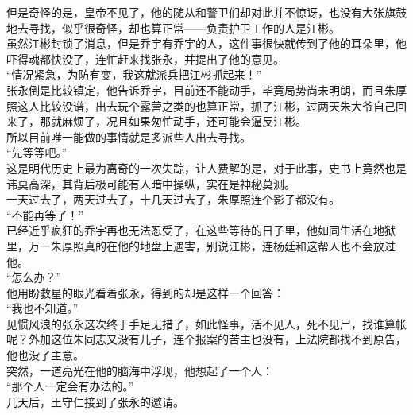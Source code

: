 \begin{multicols}{\theparacolNo}
但是奇怪的是，皇帝不见了，他的随从和警卫们却对此并不惊讶，也没有大张旗鼓地去寻找，似乎很奇怪，却也算正常——负责护卫工作的人是江彬。\\

虽然江彬封锁了消息，但是乔宇有乔宇的人，这件事很快就传到了他的耳朵里，他吓得魂都快没了，连忙赶来找张永，并提出了他的意见。\\

“情况紧急，为防有变，我这就派兵把江彬抓起来！”\\

张永倒是比较镇定，他告诉乔宇，目前还不能动手，毕竟局势尚未明朗，而且朱厚照这人比较没谱，出去玩个露营之类的也算正常，抓了江彬，过两天朱大爷自己回来了，那就麻烦了，况且如果匆忙动手，还可能会逼反江彬。\\

所以目前唯一能做的事情就是多派些人出去寻找。\\

“先等等吧。”\\

这是明代历史上最为离奇的一次失踪，让人费解的是，对于此事，史书上竟然也是讳莫高深，其背后极可能有人暗中操纵，实在是神秘莫测。\\

一天过去了，两天过去了，十几天过去了，朱厚照连个影子都没有。\\

“不能再等了！”\\

已经近乎疯狂的乔宇再也无法忍受了，在这些等待的日子里，他如同生活在地狱里，万一朱厚照真的在他的地盘上遇害，别说江彬，连杨廷和这帮人也不会放过他。\\

“怎么办？”\\

他用盼救星的眼光看着张永，得到的却是这样一个回答：\\

“我也不知道。”\\

见惯风浪的张永这次终于手足无措了，如此怪事，活不见人，死不见尸，找谁算帐呢？外加这位朱同志又没有儿子，连个报案的苦主也没有，上法院都找不到原告，他也没了主意。\\

突然，一道亮光在他的脑海中浮现，他想起了一个人：\\

“那个人一定会有办法的。”\\

几天后，王守仁接到了张永的邀请。\\


\end{multicols}
